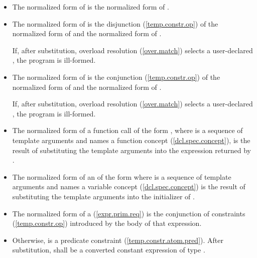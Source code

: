 \begin{itemize}
\item The normalized form of  is the normalized form of 
.

\item The normalized form of  is
the disjunction (\ref{temp.constr.op}) of the 
normalized form of  and the normalized form of 
.

If, after substitution, overload resolution 
(\ref{over.match}) selects a user-declared 
, the program is ill-formed.

\item The normalized form of  is
the conjunction (\ref{temp.constr.op}) of the 
normalized form of  and the normalized form of
.

If, after substitution, overload resolution 
(\ref{over.match}) selects a user-declared 
, the program is ill-formed.

\item The normalized form of a function call of the form
,
where 
is a sequence of template arguments and  names a function
concept (\ref{dcl.spec.concept}), is the result of 
substituting the template arguments into the expression
returned by .

\item The normalized form of an 
of the form 
where 
is a sequence of template arguments and  names a variable
concept (\ref{dcl.spec.concept}) is the result of 
substituting the template arguments into the initializer
of .

\item The normalized form of a 
(\ref{expr.prim.req}) is
the conjunction of constraints (\ref{temp.constr.op}) 
introduced by the body of that expression.


\item Otherwise,  is a predicate constraint 
(\ref{temp.constr.atom.pred}). 
% 
After substitution,  shall be a converted constant 
expression of type .

\end{itemize}


